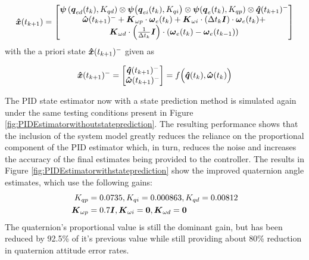 \begin{equation}
  \boldsymbol{\hat{x}}(t_{k+1}) = \begin{bmatrix} \boldsymbol{\psi}\left(\boldsymbol{q}_{ed}(t_k), K_{qd}\right) \otimes \boldsymbol{\psi}\big(\boldsymbol{q}_{ei}(t_k), K_{qi}\big) \otimes \boldsymbol{\psi}(\boldsymbol{q}_e(t_{k}), K_{qp})  \otimes \boldsymbol{\hat{q}}(t_{k+1})^- \\
  \boldsymbol{\hat{\omega}}(t_{k+1})^- + \boldsymbol{K}_{\omega p} \cdot \boldsymbol{\omega}_e(t_{k}) + \boldsymbol{K}_{\omega i} \cdot (\Delta t_k \boldsymbol{I})\cdot \boldsymbol{\omega}_e(t_{k}) + \\
  \boldsymbol{K}_{\omega d} \cdot \left(\frac{1}{\Delta t_k} \boldsymbol{I}\right) \cdot (\boldsymbol{\omega}_e(t_{k})-\boldsymbol{\omega}_e(t_{k-1})) \end{bmatrix}
  \label{eqn:PIDEstimatorwithPredictionUnforcedMotion}
\end{equation}
with the a priori state $\boldsymbol{\hat{x}}(t_{k+1})^-$ given as

\begin{equation}
  \boldsymbol{\hat{x}}(t_{k+1})^- = \begin{bmatrix}\boldsymbol{\hat{q}}(t_{k+1})^- \\ \boldsymbol{\hat{\omega}}(t_{k+1})^- \end{bmatrix} = f \Big( \boldsymbol{\hat{q}}(t_{k}), \boldsymbol{\hat{\omega}}(t_{k}) \Big)
\end{equation}

The PID state estimator now with a state prediction method is simulated again under the same testing conditions present in Figure \ref{fig:PIDEstimatorwithoutstateprediction}.  The resulting performance shows that the inclusion of the system model greatly reduces the reliance on the proportional component of the PID estimator which, in turn, reduces the noise and increases the accuracy of the final estimates being provided to the controller.  The results in Figure \ref{fig:PIDEstimatorwithstateprediction} show the improved quaternion angle estimates, which use the following gains:
\begin{equation}
  \begin{aligned}
    K_{qp} &= 0.0735, K_{qi} = 0.000863, K_{qd} = 0.00812 \\
    \boldsymbol{K}_{\omega p} &= 0.7 \boldsymbol{I}, \boldsymbol{K}_{\omega i} = \boldsymbol{0}, \boldsymbol{K}_{\omega d} = \boldsymbol{0}
  \end{aligned}
\end{equation}
The quaternion's proportional value is still the dominant gain, but has been reduced by 92.5\% of it's previous value while still providing about 80\% reduction in quaternion attitude error rates.

